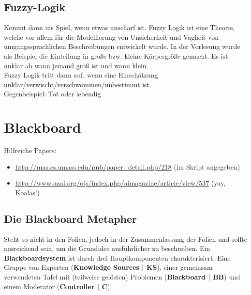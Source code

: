 \documentclass{article} %
\begin{document}
	\subsection{Fuzzy-Logik}
	Kommt dann ins Spiel, wenn etwas unscharf ist. Fuzzy Logik ist eine Theorie, welche vor allem für die Modellierung von Unsicherheit und Vagheit von umgangssprachlichen Beschreibungen entwickelt wurde. In der Vorlesung wurde als Beispiel die Einteilung in große bzw. kleine Körpergröße gemacht. Es ist unklar ab wann jemand groß ist und wann klein.\\
	
	Fuzzy Logik tritt dann auf, wenn eine Einschätzung unklar/verwischt/verschwommen/unbestimmt ist. \\
	Gegenbeispiel: Tot oder lebendig
	
	\section{Blackboard}
	Hilfreiche Papers: 
	\begin{itemize}
		\item \url{http://mas.cs.umass.edu/pub/paper_detail.php/218} (im Skript angegeben)
		\item \url{http://www.aaai.org/ojs/index.php/aimagazine/article/view/537} (yay, Koalas!)
	\end{itemize}
	\subsection{Die Blackboard Metapher}
	Steht so nicht in den Folien, jedoch in der Zusammenfassung der Folien und sollte ausreichend sein, um die Grundidee ausführlicher zu beschreiben.
	Ein \textbf{Blackboardsystem} ist durch drei Hauptkomponenten charakterisiert:
	Eine Gruppe von Experten (\textbf{Knowledge Sources | KS}), einer gemeinsam verwendeten Tafel mit (teilweise gelösten) Problemen (\textbf{Blackboard | BB}) und einem Moderator (\textbf{Controller | C}).
	 
\end{document}
